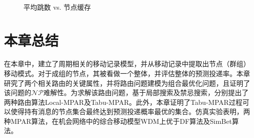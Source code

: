 \begin{figure}[htbp]
\centering
{}\quad\quad
{} \\
\quad\quad
{}
\caption{平均跳数 vs. 节点缓存}
\label{fig:chap3_hop_buffer}
\end{figure}


\section{本章总结}
\label{chap3:本章总结}
在本章中，建立了周期相关的移动记录模型，并从移动记录中提取出节点（群组）移动模式。对于成组的节点，其被看做一个整体，并评估整体的预测投递率。本章研究了两个相关路由的关键属性，并将路由问题建模为组合最优化问题，且证明了该问题的$\mathcal{NP}$难解性。为求解该路由问题，基于局部搜索及禁忌搜索，分别提出了两种路由算法Local-MPAR及Tabu-MPAR。此外，本章证明了Tabu-MPAR过程可以使得持有消息的节点集合最终达到预测投递概率最优的集合。仿真实验表明，两种MPAR算法，在机会网络中的综合移动模型WDM上优于DF算法及SimBet算法。

~\\
~\\
~\\
~\\
~\\
~\\
~\\
~\\
~\\
~\\


